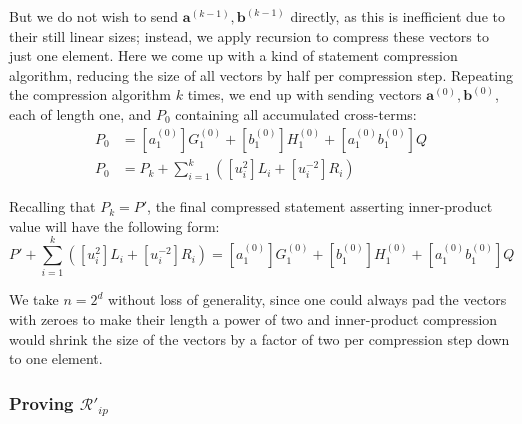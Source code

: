 \documentclass[../lecture-notes-148x210.tex]{subfiles}
\begin{document}
But we do not wish to send $\mathbf{a}^{(k-1)}, \mathbf{b}^{(k-1)}$ directly, as this is inefficient due to their still linear sizes; instead, we apply recursion to compress these vectors to just one element. Here we come up with a kind of statement compression algorithm, reducing the size of all vectors by half per compression step. Repeating the compression algorithm $k$ times, we end up with sending vectors $\mathbf{a}^{(0)}, \mathbf{b}^{(0)}$, each of length one, and $P_0$ containing all accumulated cross-terms:
\begin{align*}
    P_0 &= [a_1^{(0)}]G_1^{(0)} + [b_1^{(0)}]H_1^{(0)} + [a_1^{(0)}b_1^{(0)}]Q \\
    P_0 &= P_k + \sum_{i=1}^k ([u_i^2]L_i + [u_i^{-2}]R_i)
\end{align*}

Recalling that $P_k = P'$, the final compressed statement asserting inner-product value will have the following form:
\begin{equation}
    P' + \sum_{i=1}^k ([u_i^2]L_i + [u_i^{-2}]R_i) = [a_1^{(0)}]G_1^{(0)} + [b_1^{(0)}]H_1^{(0)} + [a_1^{(0)}b_1^{(0)}]Q
    \label{eq:ip-final-compressed}
\end{equation}

\begin{remark}
    We take $n=2^d$ without loss of generality, since one could always pad the vectors with zeroes to make their length a power of two and inner-product compression would shrink the size of the vectors by a factor of two per compression step down to one element.
\end{remark}

\subsubsection{Proving $\mathcal{R}'_{ip}$}
\end{document}
